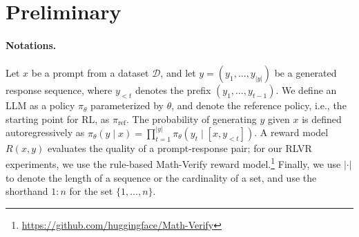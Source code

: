 \section{Preliminary}\label{sec:prelim}
\paragraph{Notations.} 

Let $x$ be a prompt from a dataset $\mathcal{D}$, and let $y = (y_1, \dots, y_{|y|})$ be a generated response sequence, where $y_{<t}$ denotes the prefix $(y_1, \dots, y_{t-1})$. We define an LLM as a policy $\pi_\theta$ parameterized by $\theta$, and denote the reference policy, i.e., the starting point for RL, as $\pi_{\mathrm{ref}}$. The probability of generating $y$ given $x$ is defined autoregressively as $\pi_\theta(y \mid x) = \prod_{t=1}^{|y|} \pi_\theta(y_t \mid [x, y_{<t}])$. A reward model $R(x, y)$ evaluates the quality of a prompt-response pair; for our RLVR experiments, we use the rule-based Math-Verify reward model.\footnote{\url{https://github.com/huggingface/Math-Verify}} Finally, we use $|\cdot|$ to denote the length of a sequence or the cardinality of a set, and use the shorthand $1:n$ for the set $\{1, \dots, n\}$.
%



